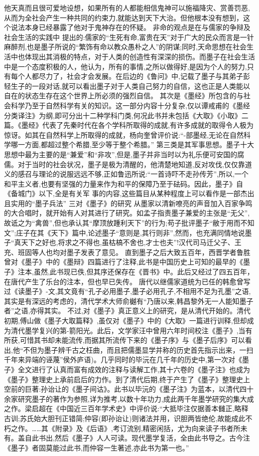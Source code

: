 \documentclass[12pt,UTF8]{ctexbook}
\begin{document}
他天真而且很可爱地设想，如果所有的人都能相信鬼神可以施福降灾、赏善罚恶,从而为全社会产生一种共同的约束力,就能达到天下大治。但他根本没有想到，这个说法本身已经暴露了他对于鬼神存在的怀疑。
非命的观点是在与儒家的争辩及社会生活的实践中
提出的:儒家的“生死有命,富贵在天”对于广大的民众而言是一针麻醉剂,也是墨子所说的“繁饰有命以教众愚朴之人”的阴谋;同时,天命思想在社会生活中也体现出其消极的特点，对于人类的创造性有深深的损伤。而墨子在社会生活中是一个态度积极的人，他认为，所有的事情,之所以做得好,是因为个人的努力,只有每个人都尽力了，社会才会发展。在后边的《鲁问》中,记载了墨子与其弟子彭轻生子的一段对话,就可以看出墨子对于人类自己努力的自信，这也正是人类能以自在的状态生存在这个世界上所必须的强烈自信。
其次是《墨经》所包含的与社会科学乃至于自然科学有关的知识。这一部分内容十分复杂,仅以谭戒甫的《墨经分类译注》为纲,即可分出十二种学科门类,何况此书并未包括《大取》《小取》二篇。《墨经》代表了先秦时代在各个学科所取得的成就,有许多成就的取得令人极为惊讶。如其在自然科学上所取得的成就，杨向奎曾评价说:“-部墨经,无论在自然科学哪一方面,都超过整个希腊,至少等于整个希腊。”
第三类是其军事思想。墨子十大思想中最为主要的是“兼爱”和“非攻”,但是,墨子并非当时以为礼乐便可安国的腐儒。对于当时的社会状况，墨子是极为清醒的，他清楚地知道,反对攻伐,仅仅靠道义的感召与理论的说服远远不够,正如鲁迅所说:“一首诗吓不走孙传芳”,所以,一个和平主义者,也要有坚强的力量来作为和平的保障乃至于砝码。因此，墨子》自《备城门》以下,全是有关军
事的内容,这些篇目从某种程度上可以看作是一部杰出且实用的“墨子兵法”
三对《墨子》的研究
从墨家以清新嘹亮的声音加入百家争鸣的大合唱时，就开始有人对其进行了研究。如孟子指责墨子兼爱的主张是“无父”,故诋之为“禽兽”,但也承认其“摩顶放踵利天下”的行为;苟子批评墨子“敝于用而不知文”;庄子在其《天下》篇中,论述墨子“意则是,其行则非”,然而，也充满同情地说墨子“真天下之好也,将求之不得也,虽枯槁不舍也,才士也夫”!汉代司马迁父子、王充、班固等人也均对墨子发表了意见。
直到墨子之后大致五百年，西晋学者鲁胜曾对《墨子》中的《墨辩》四篇进行了注释,此书是中国历史上可知的最早的《墨子》注本,虽然,此书现已佚,但其序还保存在《晋书》中。此后又经过了四五百年，在唐代产生了乐台的注本，但也早已失传。
唐代以继儒家道统为已任的韩愈曾写过《读墨子》-文,其文竟有“孔子必用墨子,墨子必用孔子,不相用不足为孔墨”之语,其实是有深远的考虑的，清代学术大师俞樾有“乃唐以来,韩昌黎外无一人能知墨子者”之语,亦得其实。
不过,对《墨子》真正意义上的研究，是从清代开始的。清代初期,傅山做《墨子大取篇释》,虽仅对《墨子》中的《大取》一篇进行训释,但却成为清代墨学复兴的第-箭阳光。此后，文学家汪中曾用六年时间校注《墨子》,当有所获,可惜其书却未能流传,而据其所流传下来的《墨子序》与《墨子后序》可以看出,他“不但为墨子辨千古之枉曲，而且把儒墨显学并称的历史首先指示出来，一扫千年来异端的诬蔑”侯外庐语)。几乎同时的毕沅在几千年的历史中,第一次对《墨子》全文进行了认真而富有成效的注释与读解工作,其十六卷的《墨子注》也成为《墨子》整理史上承前启后的力作。到了清代后期,终于产生了《墨子》整理史上空前的巨著:孙诒让的《墨子间诂》。此书以毕沅的《墨子注》为蓝本，以清代四十余家研究墨子的著作为参照,详为推考,以数十年功力,成此两千年墨学研究的集大成之作。梁启超在《中国近三百年学术史》中评价说:“大抵毕注仅据善本雠正,略释古训;苏氏始大胆刊正错简;仲容(即孙诒让)则诸法并用，识胆两皆绝伦,故能成此不朽之作。……其《附录》及《后语》,考订流别,精密闲括，尤为向来读子书者所未有。盖自此书出,然后《墨子》人人可读。现代墨学复活，全由此书导之。古今注《墨子》者固莫能过此书,而仲容一生著述,亦此书为第一也。”
\end{document}
